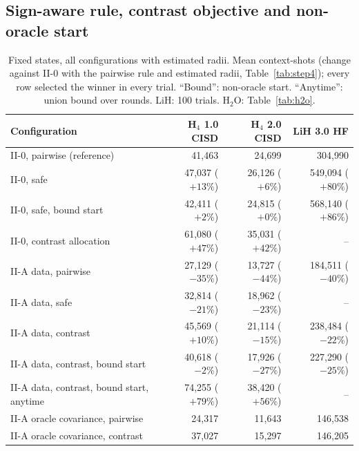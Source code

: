 \documentclass[10.5pt]{article}
\begin{document}
\subsection{Sign-aware rule, contrast objective and non-oracle start}

\begin{table}[!ht]
\centering\small
\caption{Fixed states, all configurations with estimated radii. Mean context-shots (change against II-0 with the pairwise rule and estimated radii, Table~\ref{tab:step4}); every row selected the winner in every trial. ``Bound'': non-oracle start. ``Anytime'': union bound over rounds. LiH: 100 trials. H$_2$O: Table~\ref{tab:h2o}.}
\label{tab:step4plus}
\setlength{\tabcolsep}{4pt}
\begin{tabular}{lrrr}
\toprule
Configuration & H$_4$ 1.0 CISD & H$_4$ 2.0 CISD & LiH 3.0 HF \\
\midrule
II-0, pairwise (reference) & 41,463 & 24,699 & 304,990 \\
II-0, safe & 47,037 ($+13\%$) & 26,126 ($+6\%$) & 549,094 ($+80\%$) \\
II-0, safe, bound start & 42,411 ($+2\%$) & 24,815 ($+0\%$) & 568,140 ($+86\%$) \\
II-0, contrast allocation & 61,080 ($+47\%$) & 35,031 ($+42\%$) & -- \\
\midrule
II-A data, pairwise & 27,129 ($-35\%$) & 13,727 ($-44\%$) & 184,511 ($-40\%$) \\
II-A data, safe & 32,814 ($-21\%$) & 18,962 ($-23\%$) & -- \\
II-A data, contrast & 45,569 ($+10\%$) & 21,114 ($-15\%$) & 238,484 ($-22\%$) \\
II-A data, contrast, bound start & 40,618 ($-2\%$) & 17,926 ($-27\%$) & 227,290 ($-25\%$) \\
II-A data, contrast, bound start, anytime & 74,255 ($+79\%$) & 38,420 ($+56\%$) & -- \\
\midrule
II-A oracle covariance, pairwise & 24,317 & 11,643 & 146,538 \\
II-A oracle covariance, contrast & 37,027 & 15,297 & 146,205 \\
\bottomrule
\end{tabular}
\end{table}
\end{document}
